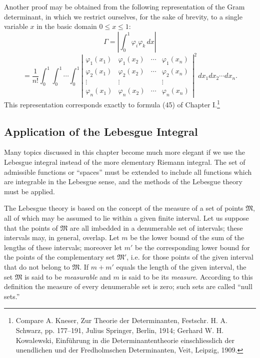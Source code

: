 Another proof may be obtained from the following representation of the Gram determinant, in which we restrict ourselves, for the sake of brevity, to a single variable $x$ in the basic domain $0\le x\le1$:
\[
\Gamma=\left|\int_0^1\varphi_i\varphi_k\,dx\right|
\]
\[
=\frac{1}{n!}\int_0^1\!\int_0^1\!\cdots\!\int_0^1
\left|
\begin{matrix}
\varphi_1(x_1)&\varphi_1(x_2)&\cdots&\varphi_1(x_n)\\
\varphi_2(x_1)&\varphi_2(x_2)&\cdots&\varphi_2(x_n)\\
\vdots&\vdots&&\vdots\\
\varphi_n(x_1)&\varphi_n(x_2)&\cdots&\varphi_n(x_n)
\end{matrix}
\right|^2
\,dx_1dx_2\cdots dx_n.
\]
This representation corresponds exactly to formula (45) of Chapter I.\footnote{Compare A. Kneser, Zur Theorie der Determinanten, Festschr. H. A. Schwarz, pp. 177--191, Julius Springer, Berlin, 1914; Gerhard W. H. Kowalewski, Einf\"uhrung in die Determinantentheorie einschliesslich der unendlichen und der Fredholmschen Determinanten, Veit, Leipzig, 1909.}

\subsection{Application of the Lebesgue Integral}
Many topics discussed in this chapter become much more elegant if we use the Lebesgue integral instead of the more elementary Riemann integral. The set of admissible functions or ``spaces'' must be extended to include all functions which are integrable in the Lebesgue sense, and the methods of the Lebesgue theory must be applied.

The Lebesgue theory is based on the concept of the measure of a set of points $\mathfrak M$, all of which may be assumed to lie within a given finite interval. Let us suppose that the points of $\mathfrak M$ are all imbedded in a denumerable set of intervals; these intervals may, in general, overlap. Let $m$ be the lower bound of the sum of the lengths of these intervals; moreover let $m'$ be the corresponding lower bound for the points of the complementary set $\mathfrak M'$, i.e. for those points of the given interval that do not belong to $\mathfrak M$. If $m+m'$ equals the length of the given interval, the set $\mathfrak M$ is said to be \emph{measurable} and $m$ is said to be its \emph{measure}. According to this definition the measure of every denumerable set is zero; such sets are called ``null sets.''

